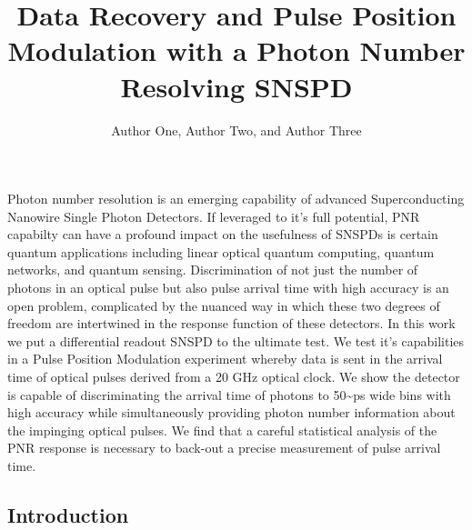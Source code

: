 \documentclass{optica-article}
\begin{document}
\title{Data Recovery and Pulse Position Modulation with a Photon Number Resolving SNSPD}

\author{Author One, Author Two, and Author Three}

\address{Peer Review, Publications Department, Optica Publishing Group, 2010 Massachusetts Avenue NW, Washington, DC 20036, USA\\
Publications Department, Optica Publishing Group, 2010 Massachusetts Avenue NW, Washington, DC 20036, USA\\
Currently with the Department of Electronic Journals, Optica Publishing Group, 2010 Massachusetts Avenue NW, Washington, DC 20036, USA}



\begin{abstract*} 
Photon number resolution is an emerging capability of advanced Superconducting Nanowire Single Photon Detectors. If leveraged to it's full potential, PNR capabilty can have a profound impact on the usefulness of SNSPDs is certain quantum applications including linear optical quantum computing, quantum networks, and quantum sensing. Discrimination of not just the number of photons in an optical pulse but also pulse arrival time with high accuracy is an open problem, complicated by the nuanced way in which these two degrees of freedom are intertwined in the response function of these detectors. In this work we put a differential readout SNSPD to the ultimate test. We test it's capabilities in a Pulse Position Modulation experiment whereby data is sent in the arrival time of optical pulses derived from a 20 GHz optical clock. We show the detector is capable of discriminating the arrival time of photons to 50\textasciitilde ps wide bins with high accuracy while simultaneously providing photon number information about the impinging optical pulses. We find that a careful statistical analysis of the PNR response is necessary to back-out a precise measurement of pulse arrival time.
\end{abstract*}

\hypertarget{introduction}{%
\subsection{Introduction}\label{introduction}}
\end{document}
